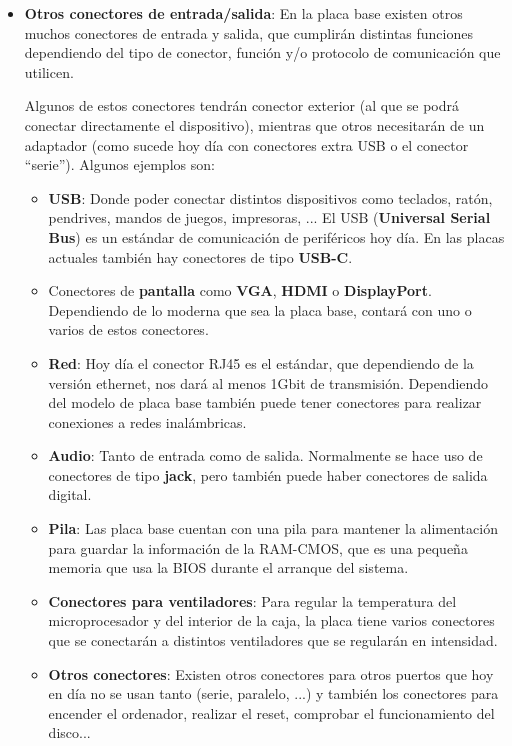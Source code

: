 \begin{itemize}
    \item \textbf{Otros conectores de entrada/salida}: En la placa base existen otros muchos conectores de entrada y salida, que cumplirán distintas funciones dependiendo del tipo de conector, función y/o protocolo de comunicación que utilicen.

    Algunos de estos conectores tendrán conector exterior (al que se podrá conectar directamente el dispositivo), mientras que otros necesitarán de un adaptador (como sucede hoy día con conectores extra USB o el conector “serie”). Algunos ejemplos son:
    \begin{itemize}
        \item \textbf{USB}: Donde poder conectar distintos dispositivos como teclados, ratón, pendrives, mandos de juegos, impresoras, ... El USB (\textbf{Universal Serial Bus}) es un estándar de comunicación de periféricos hoy día. En las placas actuales también hay conectores de tipo \textbf{USB-C}.

        \item Conectores de \textbf{pantalla} como \textbf{VGA}, \textbf{HDMI} o \textbf{DisplayPort}. Dependiendo de lo moderna que sea la placa base, contará con uno o varios de estos conectores.

        \item \textbf{Red}: Hoy día el conector RJ45 es el estándar, que dependiendo de la versión ethernet, nos dará al menos 1Gbit de transmisión. Dependiendo del modelo de placa base también puede tener conectores para realizar conexiones a redes inalámbricas.

        \item \textbf{Audio}: Tanto de entrada como de salida. Normalmente se hace uso de conectores de tipo \textbf{jack}, pero también puede haber conectores de salida digital.

        \item \textbf{Pila}: Las placa base cuentan con una pila para mantener la alimentación para guardar la información de la RAM-CMOS, que es una pequeña memoria que usa la BIOS durante el arranque del sistema.

        \item \textbf{Conectores para ventiladores}: Para regular la temperatura del microprocesador y del interior de la caja, la placa tiene varios conectores que se conectarán a distintos ventiladores que se regularán en intensidad.

        \item \textbf{Otros conectores}: Existen otros conectores para otros puertos que hoy en día no se usan tanto (serie, paralelo, ...) y también los conectores para encender el ordenador, realizar el reset, comprobar el funcionamiento del disco...
    \end{itemize}

\end{itemize}

